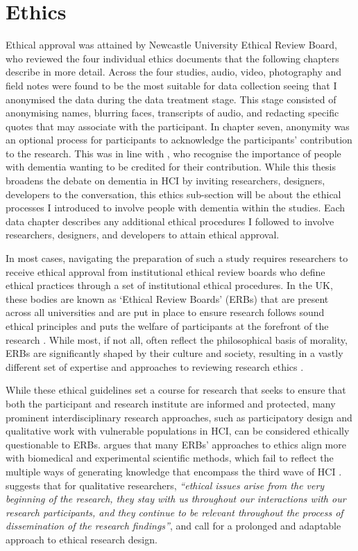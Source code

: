 \section{Ethics}
\label{Method:Ethics}
Ethical approval was attained by Newcastle University Ethical Review Board, who reviewed the four individual ethics documents that the following chapters describe in more detail. Across the four studies, audio, video, photography and field notes were found to be the most suitable for data collection seeing that I anonymised the data during the data treatment stage. This stage consisted of anonymising names, blurring faces, transcripts of audio, and redacting specific quotes that may associate with the participant. In chapter seven, anonymity was an optional process for participants to acknowledge the participants' contribution to the research. This was in line with \cite{hendriks_valuing_2018}, who recognise the importance of people with dementia wanting to be credited for their contribution. While this thesis broadens the debate on dementia in HCI by inviting researchers, designers, developers to the conversation, this ethics sub-section will be about the ethical processes I introduced to involve people with dementia within the studies. Each data chapter describes any additional ethical procedures I followed to involve researchers, designers, and developers to attain ethical approval.

In most cases, navigating the preparation of such a study requires researchers to receive ethical approval from institutional ethical review boards who define ethical practices through a set of institutional ethical procedures. In the UK, these bodies are known as ‘Ethical Review Boards’ (ERBs) that are present across all universities and are put in place to ensure research follows sound ethical principles and puts the welfare of participants at the forefront of the research \citep{pachana_can_2014}. While most, if not all, often reflect the philosophical basis of morality, ERBs are significantly shaped by their culture and society, resulting in a vastly different set of expertise and approaches to reviewing research ethics \citep{flicker_ethical_2007}.

While these ethical guidelines set a course for research that seeks to ensure that both the participant and research institute are informed and protected, many prominent interdisciplinary research approaches, such as participatory design and qualitative work with vulnerable populations in HCI, can be considered ethically questionable to ERBs. \cite{bell_censorship_2014} argues that many ERBs’ approaches to ethics align more with biomedical and experimental scientific methods, which fail to reflect the multiple ways of generating knowledge that encompass the third wave of HCI \citep{bodker_when_2006,lazar_critical_2017}. \cite{carla_introducing_2013} suggests that for qualitative researchers,\textit{ ``ethical issues arise from the very beginning of the research, they stay with us throughout our interactions with our research participants, and they continue to be relevant throughout the process of dissemination of the research findings''}, and call for a prolonged and adaptable approach to ethical research design. 

